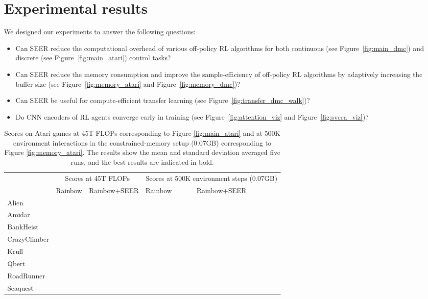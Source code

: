 \documentclass{article}
\begin{document}
\section{Experimental results}


We designed our experiments to answer the following questions: 
\begin{itemize} [leftmargin=8mm] \setlength\itemsep{0.1em}
  \item Can SEER reduce the computational overhead of various off-policy RL algorithms for both continuous (see Figure~\ref{fig:main_dmc}) and discrete (see Figure~\ref{fig:main_atari}) control tasks?
  \item Can SEER reduce the memory consumption and improve the sample-efficiency of off-policy RL algorithms by adaptively increasing the buffer size (see Figure~\ref{fig:memory_atari} and Figure~\ref{fig:memory_dmc})?
  \item Can SEER be useful for compute-efficient transfer learning (see Figure~\ref{fig:transfer_dmc_walk})?
  \item Do CNN encoders of RL agents converge early in training (see Figure~\ref{fig:attention_viz} and Figure~\ref{fig:svcca_viz})? 
\end{itemize}

\begin{table*}[]
\centering
\small
\begin{tabular}{l|ll|ll}
\toprule
 & \multicolumn{2}{c|}{Scores at 45T FLOPs} & \multicolumn{2}{c}{Scores  at 500K environment steps (0.07GB)} \\ \cline{2-5} 
 & Rainbow         & Rainbow+SEER         
 & Rainbow                 & Rainbow+SEER                  \\
 \midrule
Alien &  &   &  &   \\
Amidar &  &   &            &   \\
BankHeist &  &   &              &  \\
CrazyClimber &  &    &  &    \\
Krull &  &    &             &   \\
Qbert &  &   &             &   \\
RoadRunner &  &   &        &   \\
Seaquest &  &   &              &   \\
 \bottomrule
\end{tabular}
\caption{Scores on Atari games at 45T FLOPs corresponding to Figure \ref{fig:main_atari} and at 500K environment interactions in the constrained-memory setup (0.07GB) corresponding to Figure \ref{fig:memory_atari}. The results show the mean and standard deviation averaged five runs, and the best results are indicated in bold.} \label{tbl:main_atari}
\vspace{-0.1in}
\end{table*}
\end{document}
